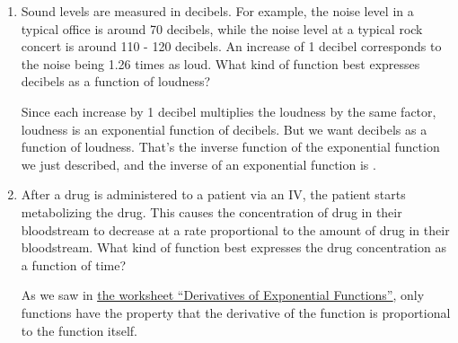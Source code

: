 \documentclass{article}
\makeatletter
\let\@href=\href
\renewcommand{\href}[2]{\@href{#1}{\ul{#2}}}
\theoremstyle{theorem}
\makeatother
\begin{document}
\begin{enumerate}
\begin{enumerate}
\begin{enumerate}
    \item
      \begin{problem}[\vfill]
        What kind of function best expresses the spaceship's position as a function of time? 
      \end{problem}

      \begin{solution}
        If we write $f(t)$ for the spaceship's position at time $t$, then $f'(t)$ is the velocity at time $t$. So, $f'(t)$ is a linear function, say $f'(t) = mt + b$. Working backwards, we see that $f(t)$ must be a  function. 
      \end{solution}

    \end{enumerate}

  \item
    \begin{problem}[\vfill]
      Sound levels are measured in decibels. For example, the noise level in a typical office is around 70 decibels, while the noise level at a typical rock concert is around 110 - 120 decibels. An increase of 1 decibel corresponds to the noise being 1.26 times as loud. What kind of function best expresses decibels as a function of loudness?
    \end{problem}

    \begin{solution}
      Since each increase by 1 decibel multiplies the loudness by the same factor, loudness is an exponential function of decibels. But we want decibels as a function of loudness. That's the inverse function of the exponential function we just described, and the inverse of an exponential function is . 
    \end{solution}    

  \item
    \begin{problem}[\vfill\newpage]
      After a drug is administered to a patient via an IV, the patient starts metabolizing the drug. This causes the concentration of drug in their bloodstream to decrease at a rate proportional to the amount of drug in their bloodstream. What kind of function best expresses the drug concentration as a function of time? 
    \end{problem}

    \begin{solution}
      As we saw in \href{https://people.math.harvard.edu/~jjchen/mathma/docs/worksheets/worksheet24-sols.html}{the worksheet ``Derivatives of Exponential Functions''}, only  functions have the property that the derivative of the function is proportional to the function itself.
    \end{solution}


\end{enumerate}
\end{enumerate}
\end{document}
